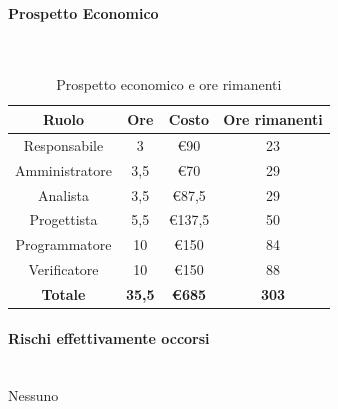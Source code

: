 \documentclass{article}
\begin{document}
                \paragraph{Prospetto Economico}\mbox{}\\
                \begin{table}[H]
                    \centering
                    \begin{tabular}{|c|c|c|c|}
                    \hline
                    \textbf{Ruolo}  & \textbf{Ore}  & \textbf{Costo} & \textbf{Ore rimanenti} \\ \hline
                    Responsabile    & 3             & €90            & 23                     \\ \hline
                    Amministratore  & 3,5           & €70            & 29                   \\ \hline
                    Analista        & 3,5           & €87,5          & 29                   \\ \hline
                    Progettista     & 5,5           & €137,5         & 50                   \\ \hline
                    Programmatore   & 10            & €150           & 84                    \\ \hline
                    Verificatore    & 10            & €150           & 88                    \\ \hline
                    \textbf{Totale} & \textbf{35,5} & \textbf{\euro685}   & \textbf{303}         \\ \hline
                    \end{tabular}
                    \caption{Prospetto economico e ore rimanenti}
                \end{table}


                \paragraph{Rischi effettivamente occorsi}\mbox{}\\
                Nessuno
\end{document}
